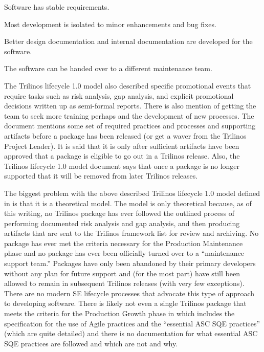 \documentclass[11pt]{SANDreport}
\begin{document}
\begin{compactitem}
\begin{compactitem}
  {}\item Software has stable requirements.

  {}\item Most development is isolated to minor enhancements and bug
  fixes.

  {}\item Better design documentation and internal documentation are
  developed for the software.

  {}\item The software can be handed over to a different maintenance
  team.
  
  \end{compactitem}

\end{compactitem}

The Trilinos lifecycle 1.0 model also described specific promotional
events that require tasks such as risk analysis, gap analysis, and
explicit promotional decisions written up as semi-formal reports.
There is also mention of getting the team to seek more training
perhaps and the development of new processes.  The document
{}\cite{TrilinosLifecycleModel2007} mentions some set of required
practices and processes and supporting artifacts before a package has
been released (or get a waver from the Trilinos Project Leader).  It
is said that it is only after sufficient artifacts have been approved
that a package is eligible to go out in a Trilinos release.  Also, the
Trilinos lifecycle 1.0 model document says that once a package is no
longer supported that it will be removed from later Trilinos releases.

The biggest problem with the above described Trilinos lifecycle 1.0
model defined in {}\cite{TrilinosLifecycleModel2007} is that it is a
theoretical model.  The model is only theoretical because, as of this
writing, no Trilinos package has ever followed the outlined process of
performing documented risk analysis and gap analysis, and then
producing artifacts that are sent to the Trilinos framework list for
review and archiving.  No package has ever met the criteria necessary
for the Production Maintenance phase and no package has ever been
officially turned over to a ``maintenance support team.''  Packages
have only been abandoned by their primary developers without any plan
for future support and (for the most part) have still been allowed to
remain in subsequent Trilinos releases (with very few exceptions).
There are no modern SE lifecycle processes that advocate this type of
approach to developing software.  There is likely not even a single
Trilinos package that meets the criteria for the Production Growth
phase in {}\cite{TrilinosLifecycleModel2007} which includes the
specification for the use of Agile practices and the ``essential ASC
SQE practices'' (which are quite detailed) and there is no
documentation for what essential ASC SQE practices are followed and
which are not and why.
\end{document}
